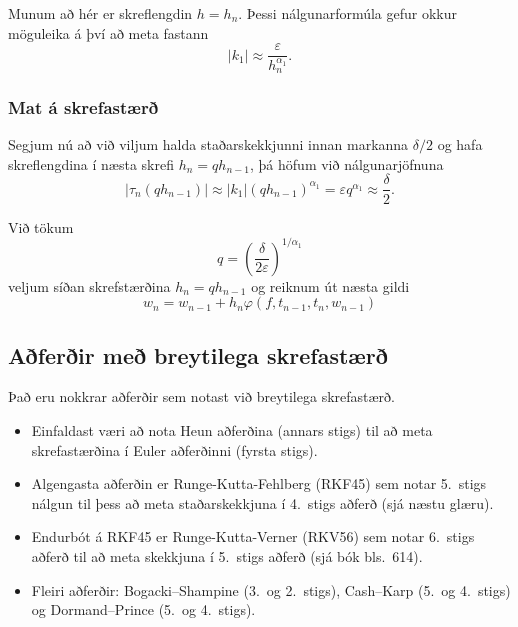 \documentclass[icelandic,a4paper,12pt]{article}
\begin{document}
\pause
Munum að hér er skreflengdin $h=h_{n}$.  
Þessi nálgunarformúla gefur
okkur möguleika á því að meta fastann 
$$|k_1|\approx
\dfrac\varepsilon{h_{n}^{\alpha_1}}.
$$



\subsubsection{Mat á skrefastærð} 
Segjum nú að við viljum halda
staðarskekkjunni innan markanna $\delta/2$ og hafa skreflengdina í
næsta skrefi $h_{n}=qh_{n-1}$, þá höfum við nálgunarjöfnuna
  $$ |\tau_n(qh_{n-1})|\approx |k_1|(qh_{n-1})^{\alpha_1}=
\varepsilon {q^{\alpha_1}} \approx  \frac{\delta} 2. $$

\pause
\smallskip
Við tökum 
  $$ q = \left(\frac{\delta}{2\varepsilon}\right)^{1/{\alpha_1}} $$
veljum síðan skrefstærðina $h_n = qh_{n-1}$ og reiknum út næsta gildi
$$ 
w_{n} = w_{n-1} + h_n\varphi(f,t_{n-1},t_n,w_{n-1}) 
$$


\subsection{Aðferðir með breytilega skrefastærð}
 Það eru nokkrar aðferðir sem notast við breytilega skrefastærð.\pause
 \begin{itemize}
  \item Einfaldast væri að nota Heun aðferðina (annars stigs) til að meta skrefastærðina í 
 Euler aðferðinni (fyrsta  stigs).\pause
 \item Algengasta aðferðin er Runge-Kutta-Fehlberg (RKF45) sem notar 5.~stigs nálgun
 til þess að meta staðarskekkjuna í 4.~stigs aðferð (sjá næstu glæru).\pause 
 \item Endurbót á RKF45 er Runge-Kutta-Verner (RKV56) sem notar 6.~stigs aðferð til að meta
 skekkjuna í 5.~stigs aðferð (sjá bók bls.~614).\pause
 \item Fleiri aðferðir: Bogacki–Shampine (3.~og 2.~stigs), 
 Cash–Karp (5.~og 4.~stigs) og Dormand–Prince (5.~og 4.~stigs).
 \end{itemize}

 
\end{document}
